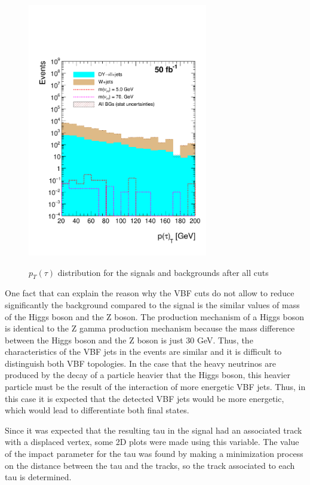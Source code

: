   \begin{figure}[h] 
 \centering
 \caption{$p_T(\tau)$ distribution for the signals and backgrounds after all cuts}
 \includegraphics[width=0.7\textwidth]{./Capitulos/Analysis/AfterVBFCUTS/TauPt_MET20} 
 \label{taupt_VBF}
 \end{figure}  

 
One fact that can explain the reason why the VBF cuts do not allow to reduce significantly the background compared to the signal is the similar values of mass of the Higgs boson and the Z boson.
The production mechanism of a Higgs boson is 
identical to the Z gamma production mechanism because the mass difference between the Higgs boson and the Z boson is just 30 GeV. Thus, the characteristics of the VBF jets in the events are similar
and it is difficult to distinguish both VBF topologies. In the case that the heavy neutrinos are produced by the decay of a particle heavier that the Higgs boson, this heavier particle must be the
result of the interaction of more energetic VBF jets. Thus, in this case it is expected that the detected VBF jets would be more energetic, which would lead to differentiate both final states.

Since it was expected that the resulting tau in the signal had an associated track with a displaced vertex, some 2D plots were made using this variable. The value of the impact parameter for the tau was found by making a minimization process on the distance between the tau and the tracks, so the track associated to each tau is determined. 

